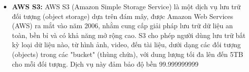 
\begin{itemize}
    \item \textbf{AWS S3:} AWS S3 (Amazon Simple Storage Service) là một dịch vụ lưu trữ đối tượng (object storage) dựa trên đám mây, được Amazon Web Services (AWS) ra mắt vào năm 2006, nhằm cung cấp giải pháp lưu trữ dữ liệu an toàn, bền bỉ và có khả năng mở rộng cao. S3 cho phép người dùng lưu trữ bất kỳ loại dữ liệu nào, từ hình ảnh, video, đến tài liệu, dưới dạng các đối tượng (objects) trong các "bucket" (thùng chứa), với dung lượng tối đa lên đến 5TB cho mỗi đối tượng. Dịch vụ này đảm bảo độ bền 99.999999999%
\end{itemize}




